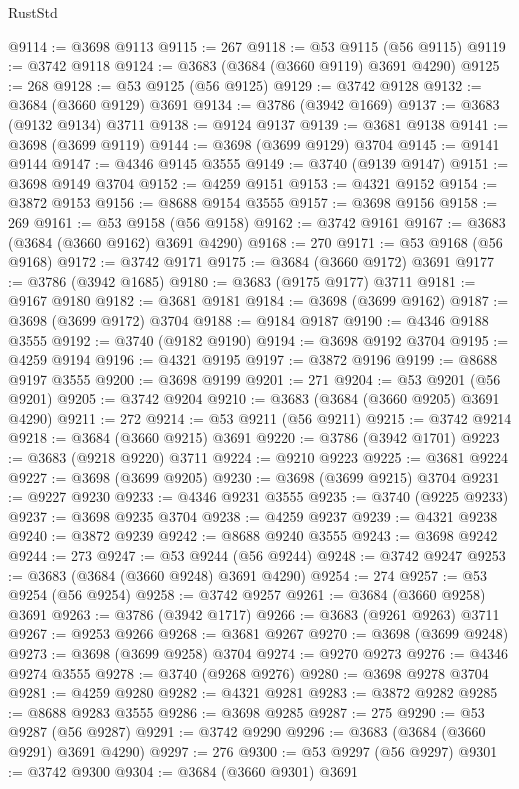 \begin{lexlean}{RustStd}
\begin{coremodule}
{\begin{coremodule}
{{{{{{{{{{{{{{{{{{{{{{{{{{{{{{{{{{{{{{{{{{{{{{{@9114 := @3698 @9113
@9115 := 267
@9118 := @53 @9115 (@56 @9115)
@9119 := @3742 @9118
@9124 := @3683 (@3684 (@3660 @9119) @3691 @4290)
@9125 := 268
@9128 := @53 @9125 (@56 @9125)
@9129 := @3742 @9128
@9132 := @3684 (@3660 @9129) @3691
@9134 := @3786 (@3942 @1669)
@9137 := @3683 (@9132 @9134) @3711
@9138 := @9124 @9137
@9139 := @3681 @9138
@9141 := @3698 (@3699 @9119)
@9144 := @3698 (@3699 @9129) @3704
@9145 := @9141 @9144
@9147 := @4346 @9145 @3555
@9149 := @3740 (@9139 @9147)
@9151 := @3698 @9149 @3704
@9152 := @4259 @9151
@9153 := @4321 @9152
@9154 := @3872 @9153
@9156 := @8688 @9154 @3555
@9157 := @3698 @9156
@9158 := 269
@9161 := @53 @9158 (@56 @9158)
@9162 := @3742 @9161
@9167 := @3683 (@3684 (@3660 @9162) @3691 @4290)
@9168 := 270
@9171 := @53 @9168 (@56 @9168)
@9172 := @3742 @9171
@9175 := @3684 (@3660 @9172) @3691
@9177 := @3786 (@3942 @1685)
@9180 := @3683 (@9175 @9177) @3711
@9181 := @9167 @9180
@9182 := @3681 @9181
@9184 := @3698 (@3699 @9162)
@9187 := @3698 (@3699 @9172) @3704
@9188 := @9184 @9187
@9190 := @4346 @9188 @3555
@9192 := @3740 (@9182 @9190)
@9194 := @3698 @9192 @3704
@9195 := @4259 @9194
@9196 := @4321 @9195
@9197 := @3872 @9196
@9199 := @8688 @9197 @3555
@9200 := @3698 @9199
@9201 := 271
@9204 := @53 @9201 (@56 @9201)
@9205 := @3742 @9204
@9210 := @3683 (@3684 (@3660 @9205) @3691 @4290)
@9211 := 272
@9214 := @53 @9211 (@56 @9211)
@9215 := @3742 @9214
@9218 := @3684 (@3660 @9215) @3691
@9220 := @3786 (@3942 @1701)
@9223 := @3683 (@9218 @9220) @3711
@9224 := @9210 @9223
@9225 := @3681 @9224
@9227 := @3698 (@3699 @9205)
@9230 := @3698 (@3699 @9215) @3704
@9231 := @9227 @9230
@9233 := @4346 @9231 @3555
@9235 := @3740 (@9225 @9233)
@9237 := @3698 @9235 @3704
@9238 := @4259 @9237
@9239 := @4321 @9238
@9240 := @3872 @9239
@9242 := @8688 @9240 @3555
@9243 := @3698 @9242
@9244 := 273
@9247 := @53 @9244 (@56 @9244)
@9248 := @3742 @9247
@9253 := @3683 (@3684 (@3660 @9248) @3691 @4290)
@9254 := 274
@9257 := @53 @9254 (@56 @9254)
@9258 := @3742 @9257
@9261 := @3684 (@3660 @9258) @3691
@9263 := @3786 (@3942 @1717)
@9266 := @3683 (@9261 @9263) @3711
@9267 := @9253 @9266
@9268 := @3681 @9267
@9270 := @3698 (@3699 @9248)
@9273 := @3698 (@3699 @9258) @3704
@9274 := @9270 @9273
@9276 := @4346 @9274 @3555
@9278 := @3740 (@9268 @9276)
@9280 := @3698 @9278 @3704
@9281 := @4259 @9280
@9282 := @4321 @9281
@9283 := @3872 @9282
@9285 := @8688 @9283 @3555
@9286 := @3698 @9285
@9287 := 275
@9290 := @53 @9287 (@56 @9287)
@9291 := @3742 @9290
@9296 := @3683 (@3684 (@3660 @9291) @3691 @4290)
@9297 := 276
@9300 := @53 @9297 (@56 @9297)
@9301 := @3742 @9300
@9304 := @3684 (@3660 @9301) @3691
}}}}}}}}}}}}}}}}}}}}}}}}}}}}}}}}}}}}}}}}}}}}}}}
\end{coremodule}}
\end{coremodule}
\end{lexlean}
